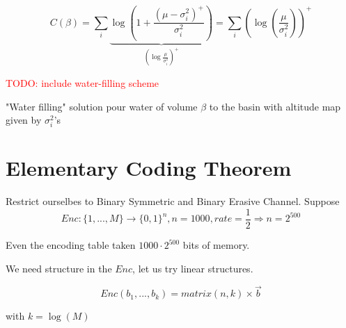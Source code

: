 \documentclass{article}
\theoremstyle{definition} %
\newcommand{\todo}[1]{\textcolor{red}{TODO: #1}}
\begin{document}
\[
  C(\beta) = \sum_i \underbrace{\log(1 + \frac{(\mu - \sigma_i^2)^+}{\sigma_i^2})}_{(\log \frac{\mu}{\sigma^2_i})^+} = \sum_i (\log(\frac{\mu}{\sigma^2_i}))^+
\]

\todo{include water-filling scheme}

"Water filling" solution pour water of volume $\beta$ to the basin with altitude map given by $\sigma^2_i$'s



\newpage

\section{Elementary Coding Theorem}
Restrict ourselbes to Binary Symmetric and Binary Erasive Channel. Suppose
\[
  Enc: \{1, ..., M\} \rightarrow \{ 0, 1\}^n, n = 1000, rate = \frac{1}{2}
  \Rightarrow n = 2^{500}
\]

Even the encoding table taken $1000 \cdot 2^{500}$ bits of memory.

We need structure in the $Enc$, let us try linear structures.

\[
  Enc(b_1, ..., b_k) = matrix(n, k) \times \vec{b}
\]

with $k = \log(M)$
\end{document}
